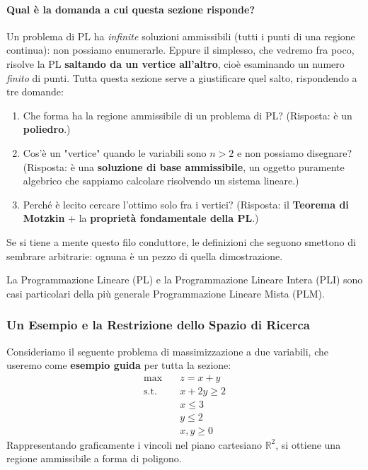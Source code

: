 \documentclass[12pt]{extarticle} %
\begin{document}
\paragraph{Qual è la domanda a cui questa sezione risponde?}
Un problema di PL ha \emph{infinite} soluzioni ammissibili (tutti i punti di una regione continua): non possiamo enumerarle. Eppure il simplesso, che vedremo fra poco, risolve la PL \textbf{saltando da un vertice all'altro}, cioè esaminando un numero \emph{finito} di punti. Tutta questa sezione serve a giustificare quel salto, rispondendo a tre domande:
\begin{enumerate}
    \item Che forma ha la regione ammissibile di un problema di PL? (Risposta: è un \textbf{poliedro}.)
    \item Cos'è un "vertice" quando le variabili sono $n>2$ e non possiamo disegnare? (Risposta: è una \textbf{soluzione di base ammissibile}, un oggetto puramente algebrico che sappiamo calcolare risolvendo un sistema lineare.)
    \item Perché è lecito cercare l'ottimo solo fra i vertici? (Risposta: il \textbf{Teorema di Motzkin} + la \textbf{proprietà fondamentale della PL}.)
\end{enumerate}
Se si tiene a mente questo filo conduttore, le definizioni che seguono smettono di sembrare arbitrarie: ognuna è un pezzo di quella dimostrazione.

\medskip
\noindent La Programmazione Lineare (PL) e la Programmazione Lineare Intera (PLI) sono casi particolari della più generale Programmazione Lineare Mista (PLM).

\subsubsection{Un Esempio e la Restrizione dello Spazio di Ricerca}
Consideriamo il seguente problema di massimizzazione a due variabili, che useremo come \textbf{esempio guida} per tutta la sezione:
\[
\begin{aligned}
\max \quad & z = x + y \\
\text{s.t.} \quad & x + 2y \ge 2 \\
& x \le 3 \\
& y \le 2 \\
& x, y \ge 0
\end{aligned}
\]
\noindent Rappresentando graficamente i vincoli nel piano cartesiano $\mathbb{R}^2$, si ottiene una regione ammissibile a forma di poligono.
\end{document}

